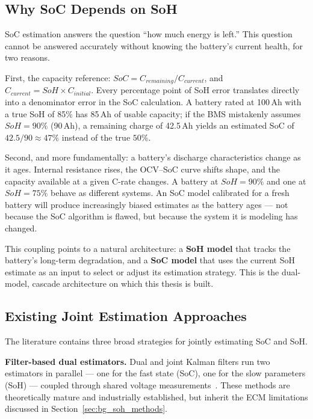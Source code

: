 \subsection{Why SoC Depends on SoH}

SoC estimation answers the question ``how much energy is left.'' This question cannot be answered accurately without knowing the battery's current health, for two reasons.

First, the capacity reference: $SoC = C_{remaining} / C_{current}$, and $C_{current} = SoH \times C_{initial}$. Every percentage point of SoH error translates directly into a denominator error in the SoC calculation. A battery rated at 100\,Ah with a true SoH of 85\% has 85\,Ah of usable capacity; if the BMS mistakenly assumes $SoH = 90\%$ (90\,Ah), a remaining charge of 42.5\,Ah yields an estimated SoC of $42.5/90 \approx 47\%$ instead of the true $50\%$.

Second, and more fundamentally: a battery's discharge characteristics change as it ages. Internal resistance rises, the OCV--SoC curve shifts shape, and the capacity available at a given C-rate changes. A battery at $SoH = 90\%$ and one at $SoH = 75\%$ behave as different systems. An SoC model calibrated for a fresh battery will produce increasingly biased estimates as the battery ages --- not because the SoC algorithm is flawed, but because the system it is modeling has changed.

This coupling points to a natural architecture: a \textbf{SoH model} that tracks the battery's long-term degradation, and a \textbf{SoC model} that uses the current SoH estimate as an input to select or adjust its estimation strategy. This is the dual-model, cascade architecture on which this thesis is built.

\subsection{Existing Joint Estimation Approaches}

The literature contains three broad strategies for jointly estimating SoC and SoH.

\textbf{Filter-based dual estimators.} Dual and joint Kalman filters run two estimators in parallel --- one for the fast state (SoC), one for the slow parameters (SoH) --- coupled through shared voltage measurements~\autocite{ECM_djEKF}. These methods are theoretically mature and industrially established, but inherit the ECM limitations discussed in Section~\ref{sec:bg_soh_methods}.

